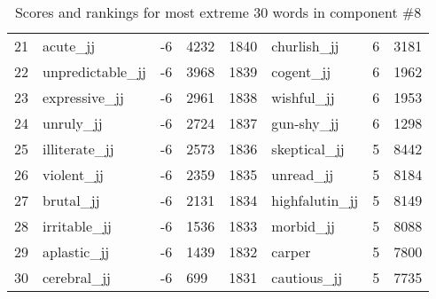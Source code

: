 \begin{table}[tbp]
\begin{tabular}{| rlr@{.}l | rlr@{.}l |}
    21 & acute\_jj & -6 & 4232    &    1840 & churlish\_jj & 6 & 3181 \\
    22 & unpredictable\_jj & -6 & 3968    &    1839 & cogent\_jj & 6 & 1962 \\
    23 & expressive\_jj & -6 & 2961    &    1838 & wishful\_jj & 6 & 1953 \\
    24 & unruly\_jj & -6 & 2724    &    1837 & gun-shy\_jj & 6 & 1298 \\
    25 & illiterate\_jj & -6 & 2573    &    1836 & skeptical\_jj & 5 & 8442 \\
    26 & violent\_jj & -6 & 2359    &    1835 & unread\_jj & 5 & 8184 \\
    27 & brutal\_jj & -6 & 2131    &    1834 & highfalutin\_jj & 5 & 8149 \\
    28 & irritable\_jj & -6 & 1536    &    1833 & morbid\_jj & 5 & 8088 \\
    29 & aplastic\_jj & -6 & 1439    &    1832 & carper & 5 & 7800 \\
    30 & cerebral\_jj & -6 & 699    &    1831 & cautious\_jj & 5 & 7735 \\
    \hline
    \end{tabular}
    \caption{Scores and rankings for most extreme 30 words in component \#8} 
\end{table}
\clearpage
